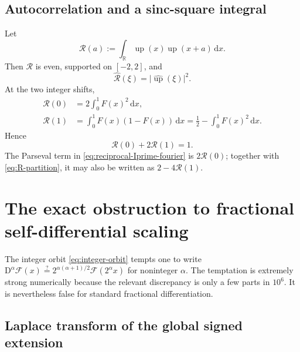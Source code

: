 \documentclass[11pt]{article}
\theoremstyle{definition}
\theoremstyle{remark}
\DeclareMathOperator{\upf}{up}
\newcommand{\R}{\mathbb R}
\newcommand{\dd}{\,\mathrm d}
\newcommand{\FF}{\mathscr F}
\newcommand{\abs}[1]{\lvert#1\rvert}
\begin{document}
\subsection{Autocorrelation and a sinc-square integral}

Let
\begin{equation}
 \mathcal R(a):=\int_\R\upf(x)\upf(x+a)\dd x.             \label{eq:autocorrelation}
\end{equation}
Then \(\mathcal R\) is even, supported on \([-2,2]\), and
\begin{equation}
 \widehat{\mathcal R}(\xi)=\abs{\widehat{\upf}(\xi)}^2. \label{eq:autocorrelation-Fourier}
\end{equation}
At the two integer shifts,
\begin{align}
 \mathcal R(0)&=2\int_0^1F(x)^2\dd x,                    \label{eq:R0}\\
 \mathcal R(1)&=\int_0^1F(x)(1-F(x))\dd x
 =\frac12-\int_0^1F(x)^2\dd x.                           \label{eq:R1}
\end{align}
Hence
\begin{equation}
 \boxed{\mathcal R(0)+2\mathcal R(1)=1.}                 \label{eq:R-partition}
\end{equation}
The Parseval term in \eqref{eq:reciprocal-Iprime-fourier} is
\(2\mathcal R(0)\); together with \eqref{eq:R-partition}, it may also be written as
\(2-4\mathcal R(1)\).

\section{The exact obstruction to fractional self-differential scaling}
\label{sec:fractional-obstruction}

The integer orbit \eqref{eq:integer-orbit} tempts one to write
\(
 \mathrm D^\alpha\FF(x)
 \stackrel?=2^{\alpha(\alpha+1)/2}\FF(2^\alpha x)
\)
for noninteger \(\alpha\).  The temptation is extremely strong numerically because the
relevant discrepancy is only a few parts in \(10^6\).  It is nevertheless false for
standard fractional differentiation.

\subsection{Laplace transform of the global signed extension}
\end{document}
